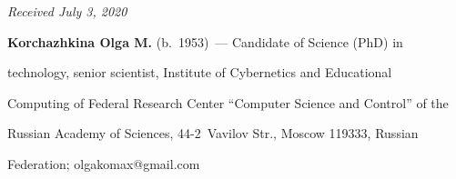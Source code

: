 \hfill{\small\textit{Received July 3, 2020}} 










\Contrl





\noindent


\textbf{Korchazhkina Olga M.} (b.\ 1953)~--- Candidate of Science (PhD) in 


technology, senior scientist, Institute of Cybernetics and Educational 


Computing of Federal Research Center ``Computer Science and Control'' of the 


Russian Academy of Sciences, 44-2~Vavilov Str., Moscow 119333, Russian 


Federation; \mbox{olgakomax@gmail.com}


\label{end\stat}





\renewcommand{\bibname}{\protect\rm Литература}  


